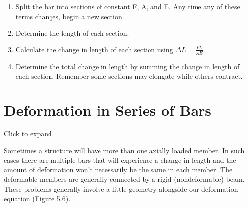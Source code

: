 \documentclass[
  letterpaper,
  DIV=11,
  numbers=noendperiod]{scrreprt}
\begin{document}
\begin{tcolorbox}[enhanced jigsaw, colback=white, colframe=quarto-callout-note-color-frame, leftrule=.75mm, opacitybacktitle=0.6, colbacktitle=quarto-callout-note-color!10!white, arc=.35mm, bottomrule=.15mm, breakable, title={Step-by-step: Axial deformation}, left=2mm, titlerule=0mm, toptitle=1mm, toprule=.15mm, opacityback=0, rightrule=.15mm, coltitle=black, bottomtitle=1mm]

\begin{enumerate}
\def\labelenumi{\arabic{enumi}.}
\item
  Split the bar into sections of constant F, A, and E. Any time any of
  these terms changes, begin a new section.
\item
  Determine the length of each section.
\item
  Calculate the change in length of each section using
  \(\Delta L=\frac{F L}{A E}\).
\item
  Determine the total change in length by summing the change in length
  of each section. Remember some sections may elongate while others
  contract.
\end{enumerate}

\end{tcolorbox}

\section{Deformation in Series of
Bars}\label{deformation-in-series-of-bars}

Click to expand

Sometimes a structure will have more than one axially loaded member. In
such cases there are multiple bars that will experience a change in
length and the amount of deformation won't necessarily be the same in
each member. The deformable members are generally connected by a rigid
(nondeformable) beam. These problems generally involve a little geometry
alongside our deformation equation (Figure 5.6).
\end{document}
